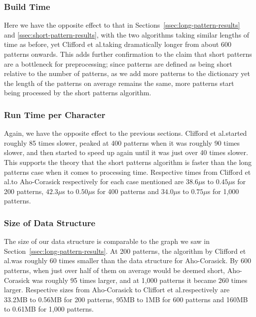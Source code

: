 \documentclass[ %
                    author={Dominic Joseph Moylett},
                    degree={MEng},
                     title={Dictionary Matching with Fingerprints},
                  subtitle={An Empirical Analysis},
                      type={research},
                      year={2015} ]{dissertation}
\begin{document}
\subsubsection{Build Time}

Here we have the opposite effect to that in Sections~\ref{ssec:long-pattern-results} and \ref{ssec:short-pattern-results}, with the two algorithms taking similar lengths of time as before, yet Clifford et al.\@ taking dramatically longer from about 600 patterns onwards. This adds further confirmation to the claim that short patterns are a bottleneck for preprocessing; since patterns are defined as being short relative to the number of patterns, as we add more patterns to the dictionary yet the length of the patterns on average remains the same, more patterns start being processed by the short patterns algorithm.

\subsubsection{Run Time per Character}

Again, we have the opposite effect to the previous sections. Clifford et al.\@ started roughly 85 times slower, peaked at 400 patterns when it was roughly 90 times slower, and then started to speed up again until it was just over 40 times slower. This supports the theory that the short patterns algorithm is faster than the long patterns case when it comes to processing time. Respective times from Clifford et al.\@ to Aho-Corasick respectively for each case mentioned are $38.6 \mu$s to $0.45 \mu$s for 200 patterns, $42.3 \mu$s to $0.50 \mu$s for 400 patterns and $34.0 \mu$s to $0.75 \mu$s for 1,000 patterns.

\subsubsection{Size of Data Structure}

The size of our data structure is comparable to the graph we saw in Section~\ref{ssec:long-pattern-results}. At 200 patterns, the algorithm by Clifford et al.\@ was roughly 60 times smaller than the data structure for Aho-Corasick. By 600 patterns, when just over half of them on average would be deemed short, Aho-Corasick was roughly 95 times larger, and at 1,000 patterns it became 260 times larger. Respective sizes from Aho-Corasick to Cliffort et al.\@ respectively are 33.2MB to 0.56MB for 200 patterns, 95MB to 1MB for 600 patterns and 160MB to 0.61MB for 1,000 patterns.
\end{document}
